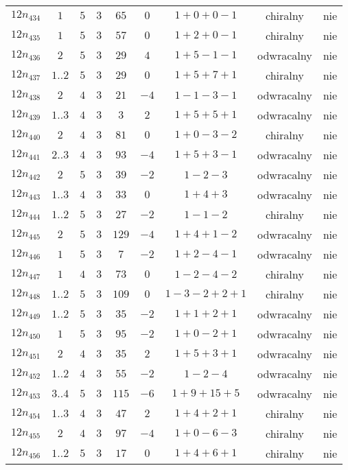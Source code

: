 \begin{longtable}{ccccccccc}
$12n_{434}$ & $1$ & $5$ & $3$ & $65$ & $0$ & $1+0+0-1$ & chiralny & nie \\
$12n_{435}$ & $1$ & $5$ & $3$ & $57$ & $0$ & $1+2+0-1$ & chiralny & nie \\
$12n_{436}$ & $2$ & $5$ & $3$ & $29$ & $4$ & $1+5-1-1$ & odwracalny & nie \\
$12n_{437}$ & $1..2$ & $5$ & $3$ & $29$ & $0$ & $1+5+7+1$ & chiralny & nie \\
$12n_{438}$ & $2$ & $4$ & $3$ & $21$ & $-4$ & $1-1-3-1$ & odwracalny & nie \\
$12n_{439}$ & $1..3$ & $4$ & $3$ & $3$ & $2$ & $1+5+5+1$ & odwracalny & nie \\
$12n_{440}$ & $2$ & $4$ & $3$ & $81$ & $0$ & $1+0-3-2$ & chiralny & nie \\
$12n_{441}$ & $2..3$ & $4$ & $3$ & $93$ & $-4$ & $1+5+3-1$ & odwracalny & nie \\
$12n_{442}$ & $2$ & $5$ & $3$ & $39$ & $-2$ & $1-2-3$ & odwracalny & nie \\
$12n_{443}$ & $1..3$ & $4$ & $3$ & $33$ & $0$ & $1+4+3$ & odwracalny & nie \\
$12n_{444}$ & $1..2$ & $5$ & $3$ & $27$ & $-2$ & $1-1-2$ & chiralny & nie \\
$12n_{445}$ & $2$ & $5$ & $3$ & $129$ & $-4$ & $1+4+1-2$ & odwracalny & nie \\
$12n_{446}$ & $1$ & $5$ & $3$ & $7$ & $-2$ & $1+2-4-1$ & odwracalny & nie \\
$12n_{447}$ & $1$ & $4$ & $3$ & $73$ & $0$ & $1-2-4-2$ & chiralny & nie \\
$12n_{448}$ & $1..2$ & $5$ & $3$ & $109$ & $0$ & $1-3-2+2+1$ & chiralny & nie \\
$12n_{449}$ & $1..2$ & $5$ & $3$ & $35$ & $-2$ & $1+1+2+1$ & odwracalny & nie \\
$12n_{450}$ & $1$ & $5$ & $3$ & $95$ & $-2$ & $1+0-2+1$ & odwracalny & nie \\
$12n_{451}$ & $2$ & $4$ & $3$ & $35$ & $2$ & $1+5+3+1$ & odwracalny & nie \\
$12n_{452}$ & $1..2$ & $4$ & $3$ & $55$ & $-2$ & $1-2-4$ & odwracalny & nie \\
$12n_{453}$ & $3..4$ & $5$ & $3$ & $115$ & $-6$ & $1+9+15+5$ & odwracalny & nie \\
$12n_{454}$ & $1..3$ & $4$ & $3$ & $47$ & $2$ & $1+4+2+1$ & chiralny & nie \\
$12n_{455}$ & $2$ & $4$ & $3$ & $97$ & $-4$ & $1+0-6-3$ & chiralny & nie \\
$12n_{456}$ & $1..2$ & $5$ & $3$ & $17$ & $0$ & $1+4+6+1$ & chiralny & nie \\

\end{longtable}
